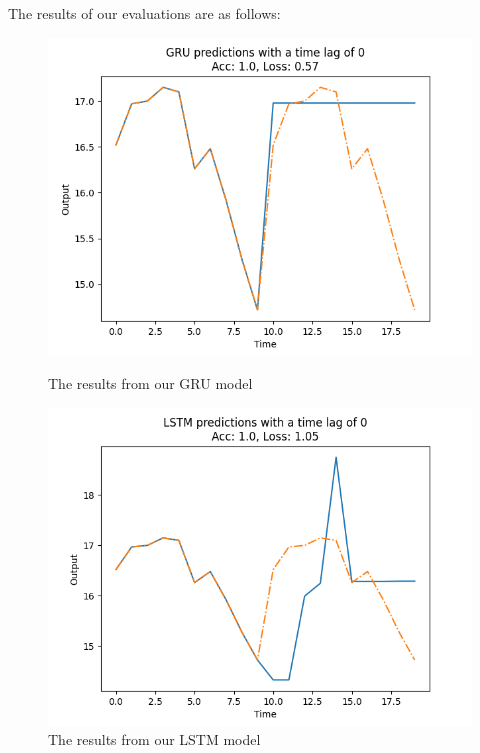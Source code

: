 \documentclass{ledger}
\begin{document}
The results of our evaluations are as follows:

\begin{figure}[H]
    \begin{minipage}{0.49\textwidth}
        \centering
        \includegraphics[width=\linewidth]{images/gruEval}
        \caption{The results from our GRU model}\label{Fig:gruEval}
    \end{minipage}\hfill
    \begin{minipage}{0.49\textwidth}
        \centering
        \includegraphics[width=\linewidth]{images/lstmEval}
        \caption{The results from our LSTM model}\label{Fig:lstmEval}
    \end{minipage}
\end{figure}
\end{document}
